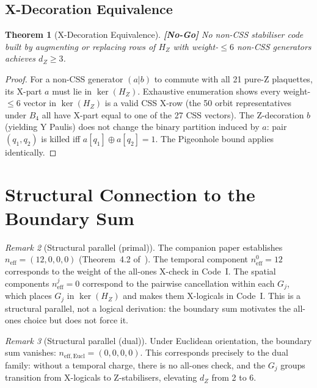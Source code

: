 \documentclass[12pt,a4paper]{article}
\theoremstyle{plain}
\newtheorem{theorem}{Theorem}[section]
\theoremstyle{definition}
\theoremstyle{remark}
\newtheorem{remark}[theorem]{Remark}
\newcommand{\HZ}{H_Z}
\newcommand{\NOGO}{\textcolor{nogocolor}{\textbf{[No-Go]}}}
\begin{document}
\subsection{X-Decoration Equivalence}

\begin{theorem}[X-Decoration Equivalence]\label{thm:nodeco}
\NOGO\;
No non-CSS stabiliser code built by augmenting or replacing rows of $\HZ$
with weight-$\leq6$ non-CSS generators achieves $d_Z \geq 3$.
\end{theorem}
\begin{proof}
For a non-CSS generator $(a|b)$ to commute with all 21 pure-Z plaquettes,
its X-part $a$ must lie in $\ker(\HZ)$.
Exhaustive enumeration shows every weight-$\leq6$ vector in $\ker(\HZ)$
is a valid CSS X-row (the 50 orbit representatives under $B_4$ all have
X-part equal to one of the 27 CSS vectors).
The Z-decoration $b$ (yielding Y Paulis) does not change the binary
partition induced by $a$: pair $(q_1,q_2)$ is killed iff
$a[q_1]\oplus a[q_2]=1$. The Pigeonhole bound applies identically.
\end{proof}

\section{Structural Connection to the Boundary Sum}\label{sec:lorentz}

\begin{remark}[Structural parallel (primal)]\label{rem:lorentz_primal}
The companion paper establishes
$n_{\mathrm{eff}} = (12, 0, 0, 0)$ (Theorem~4.2 of~\cite{SchmittCD}).
The temporal component $n_{\mathrm{eff}}^0 = 12$ corresponds to the
weight of the all-ones X-check in Code~I.
The spatial components $n_{\mathrm{eff}}^j = 0$ correspond to the
pairwise cancellation within each $G_j$, which places $G_j$ in
$\ker(\HZ)$ and makes them X-logicals in Code~I.
This is a structural parallel, not a logical derivation:
the boundary sum motivates the all-ones choice but does not force it.
\end{remark}

\begin{remark}[Structural parallel (dual)]\label{rem:lorentz_dual}
Under Euclidean orientation, the boundary sum vanishes:
$n_{\mathrm{eff},\mathrm{Eucl}} = (0, 0, 0, 0)$.
This corresponds precisely to the dual family: without a temporal charge,
there is no all-ones check, and the $G_j$ groups transition from
X-logicals to Z-stabilisers, elevating $d_Z$ from 2 to 6.
\end{remark}
\end{document}
